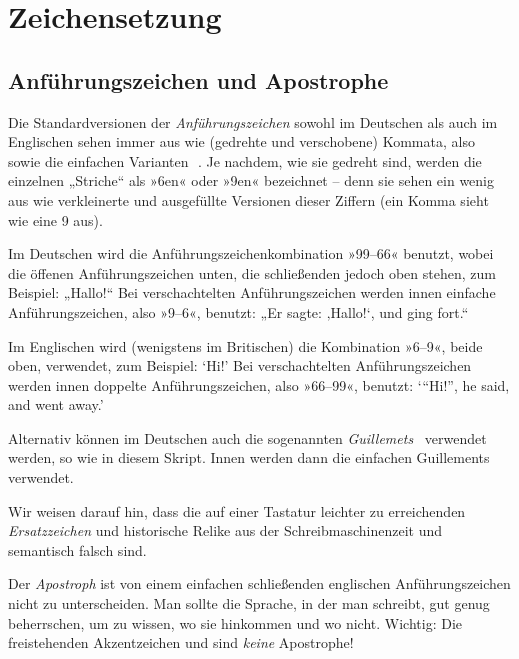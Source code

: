 \chapter{Zeichensetzung}

\lipsum[1]

\section{Anführungszeichen und Apostrophe}

Die Standardversionen der \emph{Anführungszeichen} sowohl im Deutschen
als auch im Englischen sehen immer aus wie (gedrehte und verschobene)
Kommata, also \,\, sowie die einfachen
Varianten \,\,.  Je nachdem, wie sie gedreht
sind, werden die einzelnen „Striche“ als »6en« oder »9en« bezeichnet
-- denn sie sehen ein wenig aus wie verkleinerte und ausgefüllte
Versionen dieser Ziffern (ein Komma \Char{,} sieht wie eine 9 aus).

Im Deutschen wird die Anführungszeichenkombination »99–66« benutzt, wobei die
öffenen Anführungszeichen unten, die schließenden jedoch oben stehen, zum
Beispiel: „Hallo!“ Bei verschachtelten Anführungszeichen werden innen einfache
Anführungszeichen, also »9–6«, benutzt: „Er sagte: ‚Hallo!{‘}, und ging fort.“

Im Englischen wird (wenigstens im Britischen) die Kombination »6–9«,
beide oben, verwendet, zum Beispiel: \foreignlanguage{british}{‘Hi!’}
Bei verschachtelten Anführungszeichen werden innen doppelte
Anführungszeichen, also »66–99«, benutzt:
\foreignlanguage{british}{‘“Hi!”, he said, and went away.’}

Alternativ können im Deutschen auch die sogenannten \emph{Guillemets}
\, verwendet werden, so wie in diesem Skript.  Innen
werden dann die einfachen Guillements \, verwendet.

Wir weisen darauf hin, dass die auf einer Tastatur leichter zu erreichenden
\emph{Ersatzzeichen}  und \Char{\textquotesingle} historische Relike aus
der Schreibmaschinenzeit und semantisch falsch sind.

Der \emph{Apostroph}  ist von einem einfachen schließenden englischen
Anführungszeichen nicht zu unterscheiden.  Man sollte die Sprache, in der
man schreibt, gut genug beherrschen, um zu wissen, wo sie hinkommen und wo
nicht.  Wichtig: Die freistehenden Akzentzeichen
\Char{\textasciigrave} und  sind \emph{keine} Apostrophe!


